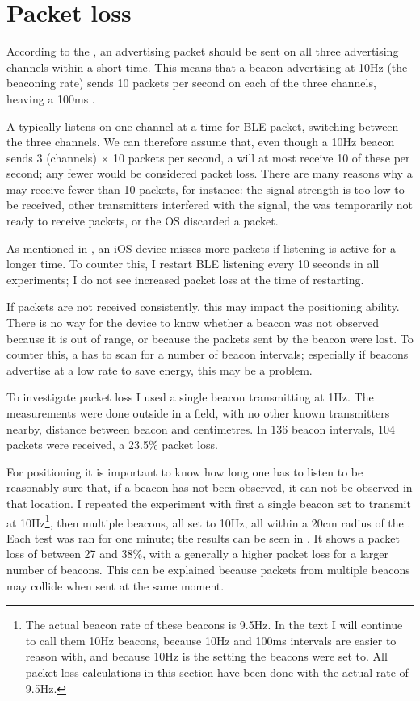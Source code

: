 \section{Packet loss}
\label{sec:rss-packet-loss}
According to the \BTspec, an advertising packet should be sent on all three advertising channels within a short time.
This means that a beacon advertising at 10Hz (the beaconing rate) sends 10 packets per second on each of the three channels, heaving a 100ms .

A \device typically listens on one channel at a time for BLE packet, switching between the three channels.
We can therefore assume that, even though a 10Hz beacon sends 3 (channels) $\times$ 10 packets per second, a \device will at most receive 10 of these per second; any fewer would be considered packet loss.
There are many reasons why a \device may receive fewer than 10 packets, for instance:
the signal strength is too low to be received, other transmitters interfered with the signal, the \device was temporarily not ready to receive packets, or the OS discarded a packet.

As mentioned in , an iOS device misses more packets if \BLE listening is active for a longer time.
To counter this, I restart BLE listening every 10 seconds in all experiments; I do not see increased packet loss at the time of restarting.

If packets are not received consistently, this may impact the positioning ability.
There is no way for the device to know whether a beacon was not observed because it is out of range, or because the packets sent by the beacon were lost.
To counter this, a \device has to scan for a number of beacon intervals; especially if beacons advertise at a low rate to save energy, this may be a problem.

To investigate packet loss I used a single beacon transmitting at 1Hz.
The measurements were done outside in a field, with no other known transmitters nearby, distance between beacon and  centimetres.
In 136 beacon intervals, 104 packets were received, a 23.5\% packet loss.

For positioning it is important to know how long one has to listen to be reasonably sure that, if a beacon has not been observed, it can not be observed in that location.
I repeated the experiment with first a single beacon set to transmit at 10Hz\footnote{The actual beacon rate of these beacons is 9.5Hz. In the text I will continue to call them 10Hz beacons, because 10Hz and 100ms intervals are easier to reason with, and because 10Hz is the setting the beacons were set to. All packet loss calculations in this section have been done with the actual rate of 9.5Hz.}, then multiple beacons, all set to 10Hz, all within a 20cm radius of the \device.
Each test was ran for one minute; the results can be seen in .
It shows a packet loss of between 27 and 38\%, with a generally a higher packet loss for a larger number of beacons.
This can be explained because packets from multiple beacons may collide when sent at the same moment.

